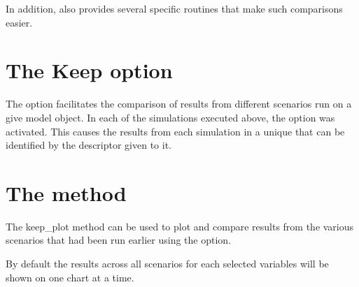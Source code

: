 \documentclass[letterpaper,10pt,english]{jupyterBook}
\begin{document}
\sphinxAtStartPar
In addition,  also provides several specific routines that make such comparisons easier.


\section{The Keep option}
\label{\detokenize{content/05_WBModels/ScenarioAnalysis:the-keep-option}}
\sphinxAtStartPar
The  option facilitates the comparison of results from different scenarios run on a give model object.  In each of the simulations executed above, the  option was activated. This causes the results from each simulation in a unique  that can be identified by the descriptor given to it.


\section{The  method}
\label{\detokenize{content/05_WBModels/ScenarioAnalysis:the-keep-plot-method}}
\sphinxAtStartPar
The keep\_plot method can be used to plot and compare results from the various scenarios that had been run earlier using the  option.

\sphinxAtStartPar
By default the results across all scenarios for each selected variables will be shown on one chart at a time.
\end{document}
